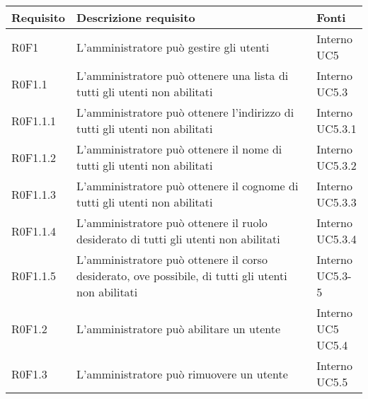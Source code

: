 \documentclass[AnalisiDeiRequisiti.tex]{subfiles}
\begin{document}
\label{table:Tabella di tracciamento requisiti-fonti}
\renewcommand*{\arraystretch}{1.2}
\begin{longtable}[H]{p{2cm}p{5.2cm}p{5cm}}
	\rowcolor{CHeader} 
	\color{CHeaderText} \textbf{Requisito} & \color{CHeaderText} \textbf{Descrizione requisito} & \color{CHeaderText} \textbf{Fonti} \\
	\endhead
	R0F1 & L'amministratore può gestire gli utenti & \makecell[tl]{
		Interno \\
		UC5
	} \\
	R0F1.1 & L'amministratore può ottenere una lista di tutti gli utenti non abilitati & \makecell[tl]{
		Interno \\
		UC5.3
	} \\
	R0F1.1.1 & L'amministratore può ottenere l'indirizzo di tutti gli utenti non abilitati & \makecell[tl]{
		Interno \\
		UC5.3.1
	} \\
	R0F1.1.2 & L'amministratore può ottenere il nome di tutti gli utenti non abilitati & \makecell[tl]{
		Interno \\
		UC5.3.2
	} \\
	R0F1.1.3 & L'amministratore può ottenere il cognome di tutti gli utenti non abilitati & \makecell[tl]{
		Interno \\
		UC5.3.3
	} \\
	R0F1.1.4 & L'amministratore può ottenere il ruolo desiderato di tutti gli utenti non abilitati & \makecell[tl]{
		Interno \\
		UC5.3.4
	} \\
	R0F1.1.5 & L'amministratore può ottenere il corso desiderato, ove possibile, di tutti gli utenti non abilitati & \makecell[tl]{
		Interno \\
		UC5.3-5
	} \\

	R0F1.2 & L'amministratore può abilitare un utente & \makecell[tl]{
		Interno \\ 
		UC5 \\ 
		UC5.4
	} \\
	R0F1.3 & L'amministratore può rimuovere un utente & \makecell[tl]{
		Interno \\ 
		UC5.5
	} \\


\end{longtable}
\end{document}

